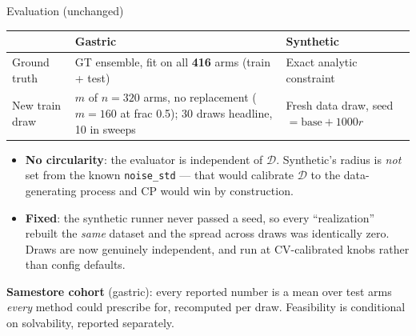 \documentclass{beamer}
\begin{document}
\begin{frame}{Evaluation (unchanged)}
  \small
  \begin{center}
  \begin{tabular}{@{}>{\raggedright\arraybackslash}p{2.6cm}>{\raggedright\arraybackslash}p{4.0cm}>{\raggedright\arraybackslash}p{4.0cm}@{}}
    \toprule
    & Gastric & Synthetic \\
    \midrule
    Ground truth & GT ensemble, fit on all \textbf{416} arms (train + test) & Exact analytic constraint \\[0.3em]
    New train draw & $m$ of $n=320$ arms, no replacement
      ($m=160$ at frac 0.5); 30 draws headline, 10 in sweeps
      & Fresh data draw, seed $= \text{base} + 1000r$ \\
    \bottomrule
  \end{tabular}
  \end{center}
  \begin{itemize}
    \item \textbf{No circularity}: the evaluator is independent of $\mathcal D$.
      Synthetic's radius is \emph{not} set from the known \texttt{noise\_std} ---
      that would calibrate $\mathcal D$ to the data-generating process and CP would
      win by construction.
    \item \textbf{Fixed}: the synthetic runner never passed a seed, so every
      ``realization'' rebuilt the \emph{same} dataset and the spread across draws
      was identically zero. Draws are now genuinely independent, and run at
      CV-calibrated knobs rather than config defaults.
  \end{itemize}
  \medskip
  \footnotesize
  \textbf{Samestore cohort} (gastric): every reported number is a mean over test
  arms \emph{every} method could prescribe for, recomputed per draw. Feasibility
  is conditional on solvability, reported separately.
\end{frame}
\end{document}
